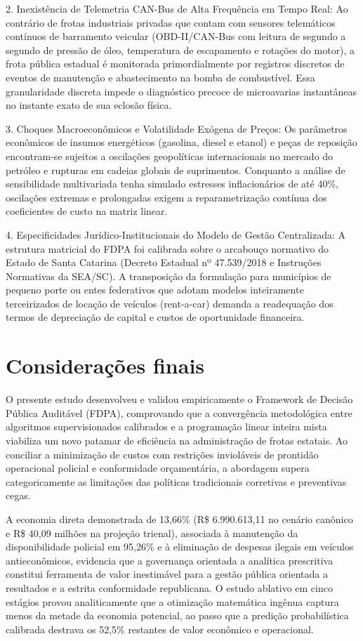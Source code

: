 \documentclass[12pt,a4paper]{article}
\begin{document}
2. Inexistência de Telemetria CAN-Bus de Alta Frequência em Tempo Real: Ao contrário de frotas industriais privadas que contam com sensores telemáticos contínuos de barramento veicular (OBD-II/CAN-Bus com leitura de segundo a segundo de pressão de óleo, temperatura de escapamento e rotações do motor), a frota pública estadual é monitorada primordialmente por registros discretos de eventos de manutenção e abastecimento na bomba de combustível. Essa granularidade discreta impede o diagnóstico precoce de microavarias instantâneas no instante exato de sua eclosão física.

3. Choques Macroeconômicos e Volatilidade Exógena de Preços: Os parâmetros econômicos de insumos energéticos (gasolina, diesel e etanol) e peças de reposição encontram-se sujeitos a oscilações geopolíticas internacionais no mercado do petróleo e rupturas em cadeias globais de suprimentos. Conquanto a análise de sensibilidade multivariada tenha simulado estresses inflacionários de até 40\%, oscilações extremas e prolongadas exigem a reparametrização contínua dos coeficientes de custo na matriz linear.

4. Especificidades Jurídico-Institucionais do Modelo de Gestão Centralizada: A estrutura matricial do FDPA foi calibrada sobre o arcabouço normativo do Estado de Santa Catarina (Decreto Estadual nº 47.539/2018 e Instruções Normativas da SEA/SC). A transposição da formulação para municípios de pequeno porte ou entes federativos que adotam modelos inteiramente terceirizados de locação de veículos (rent-a-car) demanda a readequação dos termos de depreciação de capital e custos de oportunidade financeira.


\section{Considerações finais}

O presente estudo desenvolveu e validou empiricamente o Framework de Decisão Pública Auditável (FDPA), comprovando que a convergência metodológica entre algoritmos supervisionados calibrados e a programação linear inteira mista viabiliza um novo patamar de eficiência na administração de frotas estatais. Ao conciliar a minimização de custos com restrições invioláveis de prontidão operacional policial e conformidade orçamentária, a abordagem supera categoricamente as limitações das políticas tradicionais corretivas e preventivas cegas.

A economia direta demonstrada de 13,66\% (R\$ 6.990.613,11 no cenário canônico e R\$ 40,09 milhões na projeção trienal), associada à manutenção da disponibilidade policial em 95,26\% e à eliminação de despesas ilegais em veículos antieconômicos, evidencia que a governança orientada a analítica prescritiva constitui ferramenta de valor inestimável para a gestão pública orientada a resultados e a estrita conformidade republicana. O estudo ablativo em cinco estágios provou analiticamente que a otimização matemática ingênua captura menos da metade da economia potencial, ao passo que a predição probabilística calibrada destrava os 52,5\% restantes de valor econômico e operacional.
\end{document}
